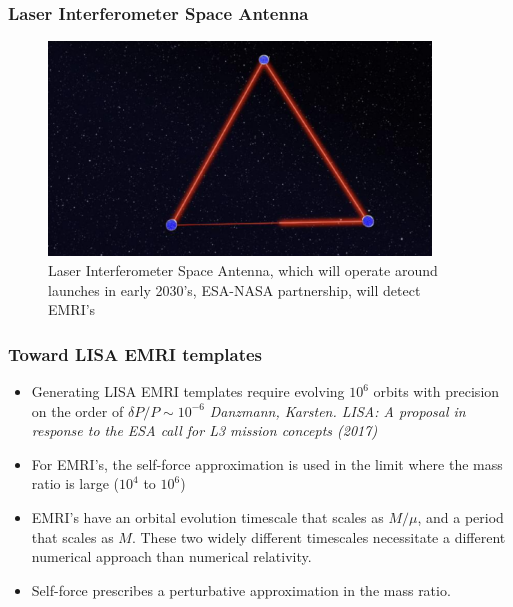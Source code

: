 \documentclass{beamer}
\begin{document}
\begin{frame}
  \frametitle{Laser Interferometer Space Antenna}
  \begin{figure}
    \includegraphics[width=4.0in]{eLISA}
    \caption{Laser Interferometer Space Antenna, which will operate around launches in early 2030's, ESA-NASA partnership, will detect EMRI's}
  \end{figure}
\end{frame}



\begin{frame}
  \frametitle{Toward LISA EMRI templates}
  \begin{itemize}
  \item Generating LISA EMRI templates require evolving $10^6$ orbits with precision on the order of $\delta P/P\sim 10^{-6}$ {\em Danzmann, Karsten. LISA: A proposal in response to the ESA call for L3 mission concepts (2017)}
  \item For EMRI's, the self-force approximation is used in the limit where the mass ratio is large ($10^4$ to $10^6$)
  \item EMRI's have an orbital evolution timescale that scales as $M/\mu$, and a period that scales as $M$. These two widely different timescales necessitate a different numerical approach than numerical relativity.
  \item Self-force prescribes a perturbative approximation in the mass ratio. 
  \end{itemize}
\end{frame}

\end{document}
